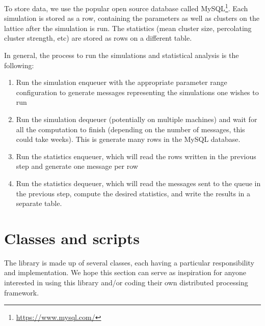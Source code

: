 To store data, we use the popular open source database called MySQL\footnote{\url{https://www.mysql.com/}}. Each simulation is stored as a row, containing the parameters as well as clusters on the lattice after the simulation is run. The statistics (mean cluster size, percolating cluster strength, etc) are stored as rows on a different table.


In general, the process to run the simulations and statistical analysis is the following:

\begin{enumerate}
  \item Run the simulation enqueuer with the appropriate parameter range configuration to generate messages representing the simulations one wishes to run
  \item Run the simulation dequeuer (potentially on multiple machines) and wait for all the computation to finish (depending on the number of messages, this could take weeks). This is generate many rows in the MySQL database.
  \item Run the statistics enqueuer, which will read the rows written in the previous step and generate one message per row 
  \item Run the statistics dequeuer, which will read the messages sent to the queue in the previous step, compute the desired statistics, and write the results in a separate table.
\end{enumerate}

\section{Classes and scripts}

The library is made up of several classes, each having a particular responsibility and implementation. We hope this section can serve as inspiration for anyone interested in using this library and/or coding their own distributed processing framework.

